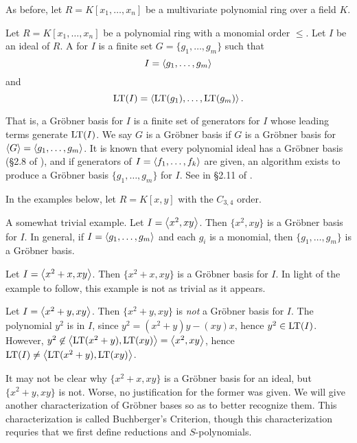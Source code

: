 As before, let $R = K[x_1, \ldots, x_n]$ be a multivariate polynomial ring over a field $K$.

\begin{definition}
  \label{def_groebner_basis}
  Let $R = K[x_1, \ldots, x_n]$ be a polynomial ring with a monomial order $\leq$.
  Let $I$ be an ideal of $R$.
  A  for $I$ is a finite set $G = \{ g_1, \ldots, g_m \}$ such that
    \[ I = \left\langle  g_1, \ldots, g_m  \right\rangle \]
  and
    \[ \operatorname{LT}(I) = \left\langle  \operatorname{LT}(g_1), \ldots, \operatorname{LT}(g_m)  \right\rangle. \]
\end{definition}
That is, a Gr\"obner basis for $I$ is a finite set of generators for $I$ whose leading terms generate $\operatorname{LT}(I)$.
We say $G$ is a Gr\"obner basis if $G$ is a Gr\"obner basis for $\left\langle G \right\rangle = \left\langle g_1, \ldots, g_m \right\rangle$.
It is known that every polynomial ideal has a Gr\"obner basis (\S 2.8 of \cite{buchberger98}),
and if generators of $I = \left\langle f_1, \ldots, f_k \right\rangle$ are given,
an algorithm exists to produce a Gr\"obner basis $\{g_1, \ldots, g_m\}$ for $I$.
See  in \S 2.11 of \cite{buchberger98}.

In the examples below, let $R = K[x,y]$ with the $C_{3,4}$ order.
\begin{example}
  \label{ex_groebner_1}
  A somewhat trivial example. Let $I = \left\langle x^2, xy \right\rangle$.
  Then $\{x^2, xy\}$ is a Gr\"obner basis for $I$.
  In general, if $I = \left\langle g_1, \ldots, g_m \right\rangle$ and each $g_i$ is a monomial,
  then $\{g_1, \ldots, g_m\}$ is a Gr\"obner basis.
\end{example}
\begin{example}
  \label{ex_groebner_2}
  Let $I = \left\langle x^2 + x, xy \right\rangle$.
  Then $\{x^2 + x, xy\}$ is a Gr\"obner basis for $I$.
  In light of the example to follow, this example is not as trivial as it appears.
\end{example}
\begin{example}
  \label{ex_groebner_3}
  Let $I = \left\langle x^2 + y, xy \right\rangle$.
  Then $\{x^2 + y, xy\}$ is \emph{not} a Gr\"obner basis for $I$.
  The polynomial $y^2$ is in $I$, since $y^2 = (x^2 + y)y - (xy)x$, hence $y^2 \in \operatorname{LT}(I)$.
  However, $y^2 \not\in \left\langle  \operatorname{LT}(x^2 + y), \operatorname{LT}(xy)  \right\rangle = \left\langle x^2, xy \right\rangle$,
  hence $\operatorname{LT}(I) \neq \left\langle  \operatorname{LT}(x^2 + y), \operatorname{LT}(xy)  \right\rangle$.
\end{example}

It may not be clear why $\{x^2 + x, xy\}$ is a Gr\"obner basis for an ideal, but $\{x^2 + y, xy\}$ is not.
Worse, no justification for the former was given.
We will give another characterization of Gr\"obner bases so as to better recognize them.
This characterization is called Buchberger's Criterion,
though this characterization requries that we first define reductions and $S$-polynomials.

